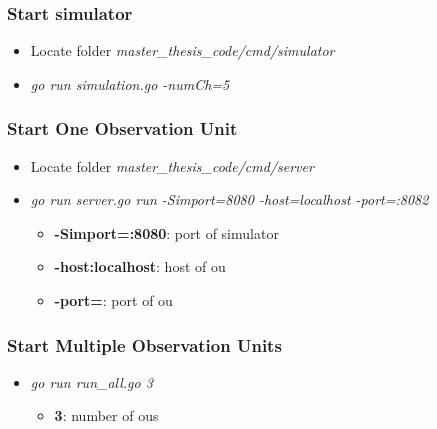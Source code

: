 \documentclass[USenglish]{uit-thesis}
\begin{document}
\subsubsection{Start simulator}
\begin{itemize}
\item Locate folder \textit{master\_thesis\_code/cmd/simulator}
\item \textit{go run simulation.go -numCh=5}
\end{itemize}

\subsubsection{Start One Observation Unit}
\begin{itemize}
\item Locate folder \textit{master\_thesis\_code/cmd/server}
\item \textit{go run server.go run -Simport=8080 -host=localhost -port=:8082}
\begin{itemize}
\item \textbf{-Simport=:8080}: port of simulator
\item \textbf{-host:localhost}: host of \gls{ou}
\item \textbf{-port=}: port of \gls{ou}
\end{itemize}
\end{itemize}

\subsubsection{Start Multiple Observation Units}
\begin{itemize}
\item \textit{go run run\_all.go 3}
\begin{itemize}
\item \textbf{3}: number of \glspl{ou}
\end{itemize}
\end{itemize}
\backmatter


\newpage{}
\end{document}
